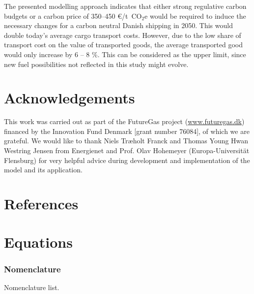\documentclass[article]{elsarticle}
\begin{document}
The presented modelling approach indicates that either strong regulative carbon budgets or a carbon price of 350--450 \euro/t~CO$_2$e would be required to induce the necessary changes for a carbon neutral Danish shipping in 2050. This would double today's average cargo transport costs. However, due to the low share of transport cost on the value of transported goods, the average transported good would only increase by 6 -- 8 \%. This can be considered as the upper limit, since new fuel possibilities not reflected in this study might evolve.

\section*{Acknowledgements}
This work was carried out as part of the FutureGas project (\url{www.futuregas.dk}) financed by the Innovation Fund Denmark [grant number 76084], of which we are grateful. We would like to thank Niels Tr\ae holt Franck and Thomas Young Hwan Westring Jensen from Energienet and Prof. Olav Hohemeyer (Europa-Universit\"at Flensburg) for very helpful advice during development and implementation of the model and its application.


\section*{References}


\newpage
\appendix
\section{Equations}\label{app:equations}
\subsubsection{Nomenclature}\label{box:nomenclature}
\glsdisablehyper
\glsaddall
\begin{table}[h]
\begin{mdframed}
\footnotesize{
\begin{multicols}{2}
\printglossary[style=tree,type=a]
\vspace{-0.3cm}
\printglossary[style=tree,type=s]
\vspace{-0.3cm}
\printglossary[style=tree,type=v]
\vspace{-0.3cm}
\printglossary[style=tree,type=p]
\end{multicols}
}
\end{mdframed}
\caption*{Nomenclature list.}
\end{table}
\end{document}
